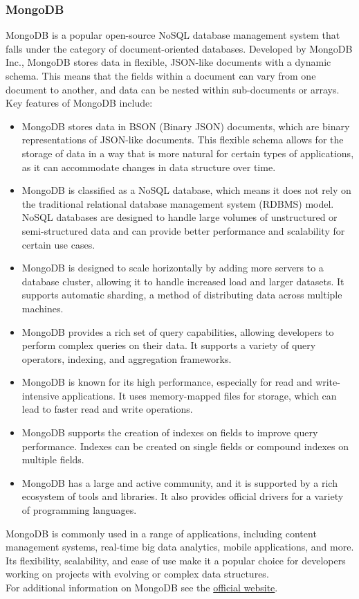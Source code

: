 \subsubsection{MongoDB}\label{mongodb}
MongoDB is a popular open-source NoSQL database management system that falls under the category of document-oriented databases. Developed by MongoDB Inc., MongoDB stores data in flexible, JSON-like documents with a dynamic schema. This means that the fields within a document can vary from one document to another, and data can be nested within sub-documents or arrays.\vspace{5mm} \\
Key features of MongoDB include:
\begin{itemize}
  \item MongoDB stores data in BSON (Binary JSON) documents, which are binary representations of JSON-like documents. This flexible schema allows for the storage of data in a way that is more natural for certain types of applications, as it can accommodate changes in data structure over time.
  \item MongoDB is classified as a NoSQL database, which means it does not rely on the traditional relational database management system (RDBMS) model. NoSQL databases are designed to handle large volumes of unstructured or semi-structured data and can provide better performance and scalability for certain use cases.
  \item MongoDB is designed to scale horizontally by adding more servers to a database cluster, allowing it to handle increased load and larger datasets. It supports automatic sharding, a method of distributing data across multiple machines.
  \item MongoDB provides a rich set of query capabilities, allowing developers to perform complex queries on their data. It supports a variety of query operators, indexing, and aggregation frameworks.
  \item MongoDB is known for its high performance, especially for read and write-intensive applications. It uses memory-mapped files for storage, which can lead to faster read and write operations.
  \item MongoDB supports the creation of indexes on fields to improve query performance. Indexes can be created on single fields or compound indexes on multiple fields.
  \item MongoDB has a large and active community, and it is supported by a rich ecosystem of tools and libraries. It also provides official drivers for a variety of programming languages.
\end{itemize}
MongoDB is commonly used in a range of applications, including content management systems, real-time big data analytics, mobile applications, and more. Its flexibility, scalability, and ease of use make it a popular choice for developers working on projects with evolving or complex data structures.\vspace{5mm} \\
For additional information on MongoDB see the \href{https://www.mongodb.com/}{official website}.
